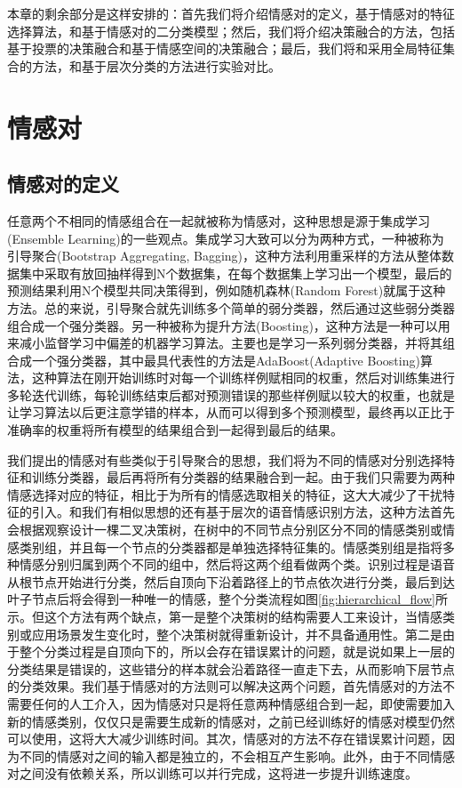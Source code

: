 本章的剩余部分是这样安排的：首先我们将介绍情感对的定义，基于情感对的特征选择算法，和基于情感对的二分类模型；然后，我们将介绍决策融合的方法，包括基于投票的决策融合和基于情感空间的决策融合；最后，我们将和采用全局特征集合的方法，和基于层次分类的方法进行实验对比。



\section{情感对}
\label{sec:emo_pair}

\subsection{情感对的定义}
\label{ssec:emo_pair_def}
任意两个不相同的情感组合在一起就被称为情感对，这种思想是源于集成学习(Ensemble Learning)的一些观点。集成学习大致可以分为两种方式，一种被称为引导聚合(Bootstrap Aggregating, Bagging)，这种方法利用重采样的方法从整体数据集中采取有放回抽样得到N个数据集，在每个数据集上学习出一个模型，最后的预测结果利用N个模型共同决策得到，例如随机森林(Random Forest)就属于这种方法。总的来说，引导聚合就先训练多个简单的弱分类器，然后通过这些弱分类器组合成一个强分类器。另一种被称为提升方法(Boosting)，这种方法是一种可以用来减小监督学习中偏差的机器学习算法。主要也是学习一系列弱分类器，并将其组合成一个强分类器，其中最具代表性的方法是AdaBoost(Adaptive Boosting)算法，这种算法在刚开始训练时对每一个训练样例赋相同的权重，然后对训练集进行多轮迭代训练，每轮训练结束后都对预测错误的那些样例赋以较大的权重，也就是让学习算法以后更注意学错的样本，从而可以得到多个预测模型，最终再以正比于准确率的权重将所有模型的结果组合到一起得到最后的结果。

我们提出的情感对有些类似于引导聚合的思想，我们将为不同的情感对分别选择特征和训练分类器，最后再将所有分类器的结果融合到一起。由于我们只需要为两种情感选择对应的特征，相比于为所有的情感选取相关的特征，这大大减少了干扰特征的引入。和我们有相似思想的还有基于层次的语音情感识别方法，这种方法首先会根据观察设计一棵二叉决策树，在树中的不同节点分别区分不同的情感类别或情感类别组，并且每一个节点的分类器都是单独选择特征集的。情感类别组是指将多种情感分别归属到两个不同的组中，然后将这两个组看做两个类。识别过程是语音从根节点开始进行分类，然后自顶向下沿着路径上的节点依次进行分类，最后到达叶子节点后将会得到一种唯一的情感，整个分类流程如图\ref{fig:hierarchical_flow}所示。但这个方法有两个缺点，第一是整个决策树的结构需要人工来设计，当情感类别或应用场景发生变化时，整个决策树就得重新设计，并不具备通用性。第二是由于整个分类过程是自顶向下的，所以会存在错误累计的问题，就是说如果上一层的分类结果是错误的，这些错分的样本就会沿着路径一直走下去，从而影响下层节点的分类效果。我们基于情感对的方法则可以解决这两个问题，首先情感对的方法不需要任何的人工介入，因为情感对只是将任意两种情感组合到一起，即使需要加入新的情感类别，仅仅只是需要生成新的情感对，之前已经训练好的情感对模型仍然可以使用，这将大大减少训练时间。其次，情感对的方法不存在错误累计问题，因为不同的情感对之间的输入都是独立的，不会相互产生影响。此外，由于不同情感对之间没有依赖关系，所以训练可以并行完成，这将进一步提升训练速度。

